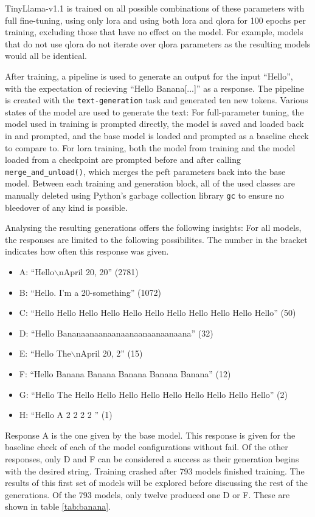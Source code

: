 TinyLlama-v1.1 is trained on all possible combinations of these parameters with full fine-tuning, using only \ac{lora} and using both \ac{lora} and \ac{qlora} for 100 epochs per training, excluding those that have no effect on the model.
For example, models that do not use \ac{qlora} do not iterate over \ac{qlora} parameters as the resulting models would all be identical.

After training, a pipeline is used to generate an output for the input \enquote{Hello}, with the expectation of recieving \enquote{Hello Banana[...]} as a response.
The pipeline is created with the \texttt{text-generation} task and generated ten new tokens.
Various states of the model are used to generate the text:
For full-parameter tuning, the model used in training is prompted directly, the model is saved and loaded back in and prompted, and the base model is loaded and prompted as a baseline check to compare to.
For \ac{lora} training, both the model from training and the model loaded from a checkpoint are prompted before and after calling \texttt{merge\_and\_unload()}, which merges the \ac{peft} parameters back into the base model.
Between each training and generation block, all of the used classes are manually deleted using Python's garbage collection library \texttt{gc} to ensure no bleedover of any kind is possible.

Analysing the resulting generations offers the following insights:
For all models, the responses are limited to the following possibilites.
The number in the bracket indicates how often this response was given.
\begin{itemize}
    \item A: \enquote{Hello$\backslash$nApril 20, 20} (2781)
    \item B: \enquote{Hello. I'm a 20-something} (1072)
    \item C: \enquote{Hello Hello Hello Hello Hello Hello Hello Hello Hello Hello Hello} (50)
    \item D: \enquote{Hello Bananaanaanaanaanaanaanaanaana} (32)
    \item E: \enquote{Hello The$\backslash$nApril 20, 2} (15)
    \item F: \enquote{Hello Banana Banana Banana Banana Banana} (12)
    \item G: \enquote{Hello The Hello Hello Hello Hello Hello Hello Hello Hello Hello} (2)
    \item H: \enquote{Hello A 2 2 2 2 } (1)
\end{itemize}
Response A is the one given by the base model.
This response is given for the baseline check of each of the model configurations without fail.
Of the other responses, only D and F can be considered a success as their generation begins with the desired string.
Training crashed after 793 models finished training.
The results of this first set of models will be explored before discussing the rest of the generations.
Of the 793 models, only twelve produced one D or F.
These are shown in table \ref{tab:banana}.

